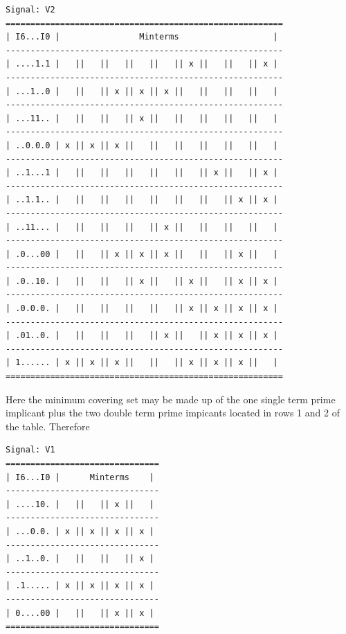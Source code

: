 \documentclass{article}
\begin{document}
\begin{enumerate}
            \begin{scriptsize}
                \begin{verbatim}
Signal: V2
========================================================
| I6...I0 |                Minterms                   |
--------------------------------------------------------
| ....1.1 |   ||   ||   ||   ||   || x ||   ||   || x |
--------------------------------------------------------
| ...1..0 |   ||   || x || x || x ||   ||   ||   ||   |
--------------------------------------------------------
| ...11.. |   ||   ||   || x ||   ||   ||   ||   ||   |
--------------------------------------------------------
| ..0.0.0 | x || x || x ||   ||   ||   ||   ||   ||   |
--------------------------------------------------------
| ..1...1 |   ||   ||   ||   ||   ||   || x ||   || x |
--------------------------------------------------------
| ..1.1.. |   ||   ||   ||   ||   ||   ||   || x || x |
--------------------------------------------------------
| ..11... |   ||   ||   ||   || x ||   ||   ||   ||   |
--------------------------------------------------------
| .0...00 |   ||   || x || x || x ||   ||   || x ||   |
--------------------------------------------------------
| .0..10. |   ||   ||   || x ||   || x ||   || x || x |
--------------------------------------------------------
| .0.0.0. |   ||   ||   ||   ||   || x || x || x || x |
--------------------------------------------------------
| .01..0. |   ||   ||   ||   || x ||   || x || x || x |
--------------------------------------------------------
| 1...... | x || x || x ||   ||   || x || x || x ||   |
========================================================
                \end{verbatim}
            \end{scriptsize}

            Here the minimum covering set may be made up of the one single term prime
            implicant plus the two double term prime impicants located in rows 1 and 2 of
            the table. Therefore 

            \begin{scriptsize}
                \begin{verbatim}
Signal: V1
===============================
| I6...I0 |      Minterms    |
-------------------------------
| ....10. |   ||   || x ||   |
-------------------------------
| ...0.0. | x || x || x || x |
-------------------------------
| ..1..0. |   ||   ||   || x |
-------------------------------
| .1..... | x || x || x || x |
-------------------------------
| 0....00 |   ||   || x || x |
===============================
                \end{verbatim}
            \end{scriptsize}


\end{enumerate}
\end{document}

